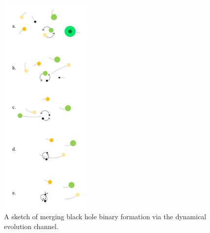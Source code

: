 \documentclass[iop,onecolumn]{revtex4}
\begin{document}
\begin{figure}
	\centering
	\includegraphics[width=0.4\textwidth]{channel3.png}
	\caption{\label{fig:dynamical} A sketch of merging black hole binary formation via the dynamical evolution channel.}
\end{figure}
\end{document}
